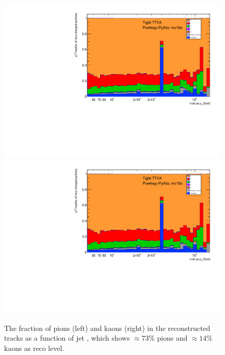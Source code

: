\begin{figure}[b]
\centering
\includegraphics[scale=0.3, page=10]{figures/jet_comp_study_powheg_Tight_pTFraction_mc16e.pdf}
\includegraphics[scale=0.3, page=11]{figures/jet_comp_study_powheg_Tight_pTFraction_mc16e.pdf}
\caption {The fraction of pions (left) and kaons (right) in the reconstructed tracks as a function of jet \pT, which shows  $\approx73$\% pions and $\approx14$\% kaons as reco level.}
\label{fig:pions_kaons}
\end{figure}

